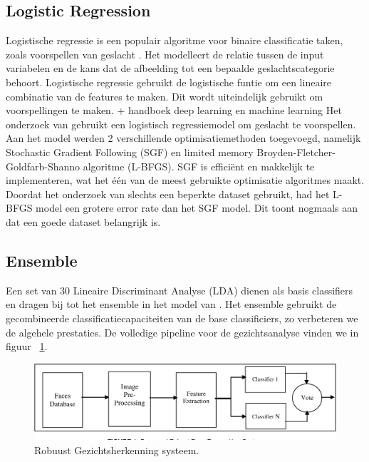 \subsection{Logistic Regression}\label{sub:logregression}
Logistische regressie is een populair algoritme voor binaire classificatie taken, zoals voorspellen van geslacht \autocite{Ramon2014}. Het modelleert de relatie tussen de input variabelen en de kans dat de afbeelding tot een bepaalde geslachtscategorie behoort. Logistische regressie gebruikt de logistische funtie om een lineaire combinatie van de features te maken. Dit wordt uiteindelijk gebruikt om voorspellingen te maken.
+ handboek deep learning en machine learning
Het onderzoek van \textcite{Yavuz2014} gebruikt een logistisch regressiemodel om geslacht te voorspellen. Aan het model werden 2 verschillende optimisatiemethoden toegevoegd, namelijk Stochastic Gradient Following (SGF) en limited memory Broyden-Fletcher-Goldfarb-Shanno algoritme (L-BFGS). SGF is efficiënt en makkelijk te implementeren, wat het één van de meest gebruikte optimisatie algoritmes maakt. Doordat het onderzoek van \textcite{Yavuz2014} slechts een beperkte dataset gebruikt, had het L-BFGS model een grotere error rate dan het SGF model. Dit toont nogmaals aan dat een goede dataset belangrijk is. 

\subsection{Ensemble}
\label{sub:ensemble}
Een set van 30 Lineaire Discriminant Analyse (LDA) dienen als basis classifiers en dragen bij tot het ensemble in het model van \textcite{Khan2017}. Het ensemble gebruikt de gecombineerde classificatiecapaciteiten van de base classificiers, zo verbeteren we de algehele prestaties. De volledige pipeline voor de gezichtsanalyse vinden we in figuur {~\ref{fig:ensemble}}. 
\begin{figure}
    \centering
    \includegraphics[width=\columnwidth]{graphics/ensemble.png}
    \caption[Robuust gezichtsherkenning systeem]{\label{fig:ensemble}Robuust Gezichtsherkenning systeem\autocite{Khan2017}.}
\end{figure}

